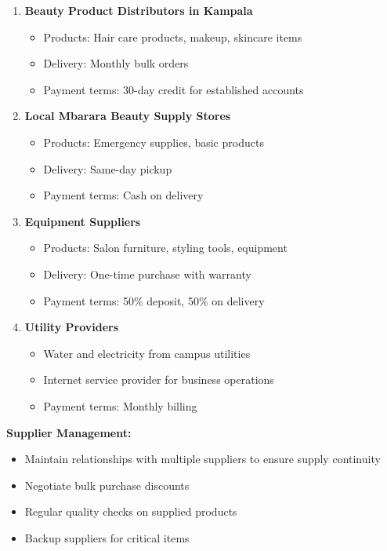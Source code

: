 \begin{enumerate}[leftmargin=2em]
    \item \textbf{Beauty Product Distributors in Kampala}
    \begin{itemize}
        \item Products: Hair care products, makeup, skincare items
        \item Delivery: Monthly bulk orders
        \item Payment terms: 30-day credit for established accounts
    \end{itemize}
    
    \item \textbf{Local Mbarara Beauty Supply Stores}
    \begin{itemize}
        \item Products: Emergency supplies, basic products
        \item Delivery: Same-day pickup
        \item Payment terms: Cash on delivery
    \end{itemize}
    
    \item \textbf{Equipment Suppliers}
    \begin{itemize}
        \item Products: Salon furniture, styling tools, equipment
        \item Delivery: One-time purchase with warranty
        \item Payment terms: 50\% deposit, 50\% on delivery
    \end{itemize}
    
    \item \textbf{Utility Providers}
    \begin{itemize}
        \item Water and electricity from campus utilities
        \item Internet service provider for business operations
        \item Payment terms: Monthly billing
    \end{itemize}
\end{enumerate}

\textbf{Supplier Management:}
\begin{itemize}[leftmargin=2em]
    \item Maintain relationships with multiple suppliers to ensure supply continuity
    \item Negotiate bulk purchase discounts
    \item Regular quality checks on supplied products
    \item Backup suppliers for critical items
\end{itemize}


